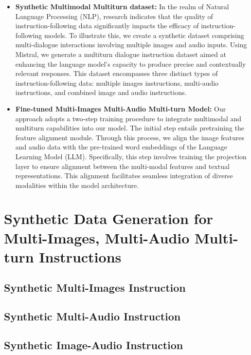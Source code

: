 \documentclass[preprint]{article}
\begin{document}
\begin{itemize}
  \item \textbf{Synthetic Multimodal Multiturn dataset:} In the realm of Natural Language Processing (NLP), research indicates that the quality of instruction-following data significantly impacts the efficacy of instruction-following models. To illustrate this, we create a synthetic dataset comprising multi-dialogue interactions involving multiple images and audio inputs. Using Mistral, we generate a multiturn dialogue instruction dataset aimed at enhancing the language model's capacity to produce precise and contextually relevant responses. This dataset encompasses three distinct types of instruction-following data: multiple images instructions, 
  multi-audio instructions, and combined image and audio instructions.

\item \textbf{Fine-tuned Multi-Images Multi-Audio Multi-turn Model:} Our approach adopts a two-step training procedure to integrate multimodal and multiturn capabilities into our model. The initial step entails pretraining the feature alignment module. Through this process, we align the image features and audio data with the pre-trained word embeddings of the Language Learning Model (LLM). Specifically, this step involves training the projection layer to ensure alignment between the multi-modal features and textual representations. This alignment facilitates seamless integration of diverse modalities within the model architecture.
\end{itemize}

\pagebreak


\section{Synthetic Data Generation for Multi-Images, Multi-Audio Multi-turn Instructions}

\subsection{Synthetic Multi-Images Instruction}

\subsection{Synthetic Multi-Audio Instruction}

\subsection{Synthetic Image-Audio Instruction}
\end{document}
